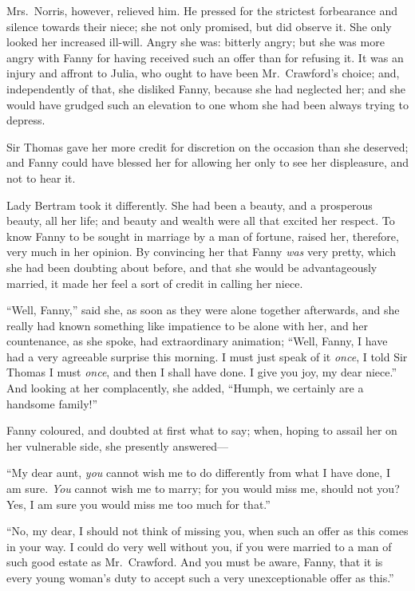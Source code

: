 \documentclass{article}
\begin{document}
Mrs.\ Norris, however, relieved him.  He pressed
for the strictest forbearance and silence towards
their niece; she not only promised, but did observe it.
She only looked her increased ill-will. Angry she was:
bitterly angry; but she was more angry with Fanny for
having received such an offer than for refusing it.
It was an injury and affront to Julia, who ought to have
been Mr.\ Crawford's choice; and, independently of that,
she disliked Fanny, because she had neglected her;
and she would have grudged such an elevation to one whom
she had been always trying to depress.

Sir Thomas gave her more credit for discretion on the
occasion than she deserved; and Fanny could have blessed
her for allowing her only to see her displeasure,
and not to hear it.

Lady Bertram took it differently.  She had been a beauty,
and a prosperous beauty, all her life; and beauty
and wealth were all that excited her respect.  To know
Fanny to be sought in marriage by a man of fortune,
raised her, therefore, very much in her opinion.
By convincing her that Fanny \emph{was} very pretty, which she
had been doubting about before, and that she would be
advantageously married, it made her feel a sort of credit
in calling her niece.

``Well, Fanny,'' said she, as soon as they were alone
together afterwards, and she really had known something
like impatience to be alone with her, and her countenance,
as she spoke, had extraordinary animation; ``Well, Fanny,
I have had a very agreeable surprise this morning.  I must
just speak of it \emph{once}, I told Sir Thomas I must \emph{once},
and then I shall have done.  I give you joy, my dear niece.''
And looking at her complacently, she added, ``Humph, we
certainly are a handsome family!''

Fanny coloured, and doubted at first what to say;
when, hoping to assail her on her vulnerable side,
she presently answered---%

``My dear aunt, \emph{you} cannot wish me to do differently from
what I have done, I am sure.  \emph{You} cannot wish me to marry;
for you would miss me, should not you?  Yes, I am sure
you would miss me too much for that.''

``No, my dear, I should not think of missing you,
when such an offer as this comes in your way.
I could do very well without you, if you were married
to a man of such good estate as Mr.\ Crawford.  And you
must be aware, Fanny, that it is every young woman's
duty to accept such a very unexceptionable offer as this.''
\end{document}
